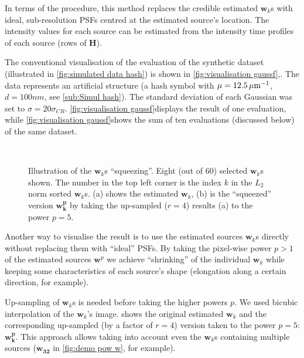 In terms of the \inmf{} procedure, this method replaces the credible estimated $\bm{w}_k$s with ideal, sub-resolution PSFs centred at the estimated source's location. The intensity values for each source can be estimated from the intensity time profiles of each source (rows of $\bm{H}$). 

The conventional visualisation of the \inmf{} evaluation of the synthetic dataset (illustrated in \autoref{fig:simulated data hash}) is shown in \autoref{fig:visualisation gaussf}\aaa,\bbb. The data represents an artificial structure (a hash symbol with $\mu = 12.5\, \mathrm{\mu m}^{-1}$, $d=100 \unit{nm}$, see \autoref{sub:Simul hash}). The standard deviation of each Gaussian was set to $\sigma=20\sigma_{CR}$.  \autoref{fig:visualisation gaussf}\aaa displays the result of one evaluation, while  \autoref{fig:visualisation gaussf}\bbb shows the sum of ten evaluations (discussed below) of the same dataset.

\begin{figure}[!hbt]
	\newcommand{\sizef}{.8}			
	\newcommand{\widthfig}{1\textwidth}	
	\centering
	\\
	\caption{Illustration of the $\bm{w}_k$s ``squeezing''. Eight (out of 60) selected $\bm{w}_k$s  shown. The number in the top left corner is the index $k$ in the $L_2$ norm sorted $\bm{w}_k$s. (a) shows the \inmf{} estimated $\bm{w}_k$, (b) is the ``squeezed'' version  $\bm{w_k^p}$ by taking the up-sampled ($r=4$) results (a) to the power $p=5$.}
	\label{fig:demo pow w}	
\end{figure}

Another way to visualise the result is to use the estimated sources $\bm{w}_k$s directly without replacing them with ``ideal'' PSFs. By taking the pixel-wise power $p>1$ of the estimated sources $\bm{w}^p$ we achieve ``shrinking'' of the individual $\bm{w}_k$ while keeping some characteristics of each source's shape (elongation along a certain direction, for example). 

Up-sampling of $\bm{w}_k$s is needed before taking the higher powers $p$. We used bicubic interpolation of the $\bm{w}_k$'s image.  shows the original estimated $\bm{w}_k$ and the corresponding up-sampled (by a factor of $r=4$) version taken to the power $p=5$: $\bm{w^p_k}$. This approach allows taking into account even the $\bm{w}_k$s containing multiple sources ($\bm{w_{32}}$ in \autoref{fig:demo pow w}, for example).

